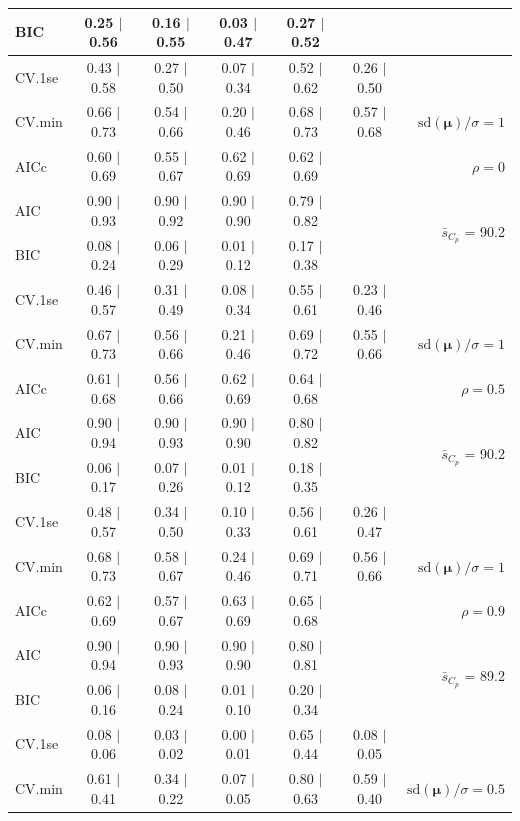 \documentclass[12pt]{article}
\newcommand{\mr}[1]{\mathrm{#1}}
\newcommand{\bm}[1]{\mathbf{#1}}
\begin{document}
\begin{table}[p]
\begin{center}
\begin{tabular}{l*{5}{c}|r}
BIC & 0.25 $\mid$ 0.56 & 0.16 $\mid$ 0.55 & 0.03 $\mid$ 0.47 & 0.27 $\mid$ 0.52 & & \\
 \hline 
CV.1se & 0.43 $\mid$ 0.58 & 0.27 $\mid$ 0.50 & 0.07 $\mid$ 0.34 & 0.52 $\mid$ 0.62 & 0.26 $\mid$ 0.50 &\\
CV.min & 0.66 $\mid$ 0.73 & 0.54 $\mid$ 0.66 & 0.20 $\mid$ 0.46 & 0.68 $\mid$ 0.73 & 0.57 $\mid$ 0.68 &  $\mr{sd}(\bm{\mu})/\sigma=1$ \\
AICc & 0.60 $\mid$ 0.69 & 0.55 $\mid$ 0.67 & 0.62 $\mid$ 0.69 & 0.62 $\mid$ 0.69 & & $\rho=0$ \\
AIC & 0.90 $\mid$ 0.93 & 0.90 $\mid$ 0.92 & 0.90 $\mid$ 0.90 & 0.79 $\mid$ 0.82 & & \multirow{2}{*}{$\bar{s}_{C_p}$ = 90.2} \\
BIC & 0.08 $\mid$ 0.24 & 0.06 $\mid$ 0.29 & 0.01 $\mid$ 0.12 & 0.17 $\mid$ 0.38 & & \\
 \hline 
CV.1se & 0.46 $\mid$ 0.57 & 0.31 $\mid$ 0.49 & 0.08 $\mid$ 0.34 & 0.55 $\mid$ 0.61 & 0.23 $\mid$ 0.46 &\\
CV.min & 0.67 $\mid$ 0.73 & 0.56 $\mid$ 0.66 & 0.21 $\mid$ 0.46 & 0.69 $\mid$ 0.72 & 0.55 $\mid$ 0.66 &  $\mr{sd}(\bm{\mu})/\sigma=1$ \\
AICc & 0.61 $\mid$ 0.68 & 0.56 $\mid$ 0.66 & 0.62 $\mid$ 0.69 & 0.64 $\mid$ 0.68 & & $\rho=0.5$ \\
AIC & 0.90 $\mid$ 0.94 & 0.90 $\mid$ 0.93 & 0.90 $\mid$ 0.90 & 0.80 $\mid$ 0.82 & & \multirow{2}{*}{$\bar{s}_{C_p}$ = 90.2} \\
BIC & 0.06 $\mid$ 0.17 & 0.07 $\mid$ 0.26 & 0.01 $\mid$ 0.12 & 0.18 $\mid$ 0.35 & & \\
 \hline 
CV.1se & 0.48 $\mid$ 0.57 & 0.34 $\mid$ 0.50 & 0.10 $\mid$ 0.33 & 0.56 $\mid$ 0.61 & 0.26 $\mid$ 0.47 &\\
CV.min & 0.68 $\mid$ 0.73 & 0.58 $\mid$ 0.67 & 0.24 $\mid$ 0.46 & 0.69 $\mid$ 0.71 & 0.56 $\mid$ 0.66 &  $\mr{sd}(\bm{\mu})/\sigma=1$ \\
AICc & 0.62 $\mid$ 0.69 & 0.57 $\mid$ 0.67 & 0.63 $\mid$ 0.69 & 0.65 $\mid$ 0.68 & & $\rho=0.9$ \\
AIC & 0.90 $\mid$ 0.94 & 0.90 $\mid$ 0.93 & 0.90 $\mid$ 0.90 & 0.80 $\mid$ 0.81 & & \multirow{2}{*}{$\bar{s}_{C_p}$ = 89.2} \\
BIC & 0.06 $\mid$ 0.16 & 0.08 $\mid$ 0.24 & 0.01 $\mid$ 0.10 & 0.20 $\mid$ 0.34 & & \\
 \hline 
CV.1se & 0.08 $\mid$ 0.06 & 0.03 $\mid$ 0.02 & 0.00 $\mid$ 0.01 & 0.65 $\mid$ 0.44 & 0.08 $\mid$ 0.05 &\\
CV.min & 0.61 $\mid$ 0.41 & 0.34 $\mid$ 0.22 & 0.07 $\mid$ 0.05 & 0.80 $\mid$ 0.63 & 0.59 $\mid$ 0.40 &  $\mr{sd}(\bm{\mu})/\sigma=0.5$ \\

\end{tabular}
\end{center}
\end{table}
\end{document}
